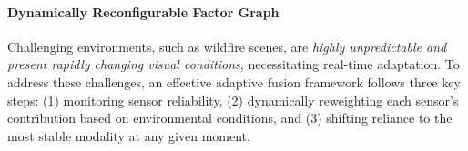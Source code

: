 


\paragraph{\textbf{Dynamically Reconfigurable Factor Graph}} Challenging environments, such as wildfire scenes, are \textit{highly unpredictable and present rapidly changing visual conditions}, necessitating real-time adaptation. To address these challenges, an effective adaptive fusion framework follows three key steps: (1) monitoring sensor reliability, (2) dynamically reweighting each sensor’s contribution based on environmental conditions, and (3) shifting reliance to the most stable modality at any given moment.

